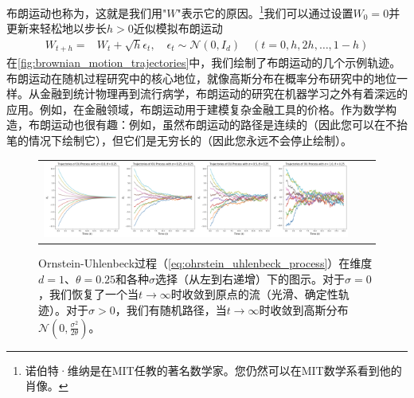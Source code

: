 布朗运动也称为，这就是我们用"$W$"表示它的原因。\footnote{诺伯特·维纳是在MIT任教的著名数学家。您仍然可以在MIT数学系看到他的肖像。}我们可以通过设置$W_0=0$并更新来轻松地以步长$h>0$近似模拟布朗运动
\begin{align}
    W_{t+h} =& W_{t} + \sqrt{h}\epsilon_t,\quad \epsilon_t\sim\mathcal{N}(0,I_d)\quad (t=0,h,2h,\dots,1-h)
\end{align}
在\cref{fig:brownian_motion_trajectories}中，我们绘制了布朗运动的几个示例轨迹。布朗运动在随机过程研究中的核心地位，就像高斯分布在概率分布研究中的地位一样。从金融到统计物理再到流行病学，布朗运动的研究在机器学习之外有着深远的应用。例如，在金融领域，布朗运动用于建模复杂金融工具的价格。作为数学构造，布朗运动也很有趣：例如，虽然布朗运动的路径是连续的（因此您可以在不抬笔的情况下绘制它），但它们是无穷长的（因此您永远不会停止绘制）。

\begin{figure}
    \centering
    \begin{tabular}{ccc}
         \includegraphics[width=\textwidth]{figures/ou_process.png} &
    \end{tabular}
    \caption{Ornstein-Uhlenbeck过程（\cref{eq:ohrstein_uhlenbeck_process}）在维度$d=1$、$\theta=0.25$和各种$\sigma$选择（从左到右递增）下的图示。对于$\sigma=0$，我们恢复了一个当$t \to \infty$时收敛到原点的流（光滑、确定性轨迹）。对于$\sigma>0$，我们有随机路径，当$t\to\infty$时收敛到高斯分布$\mathcal{N}(0,\frac{\sigma^2}{2\theta})$。}
\end{figure} 

